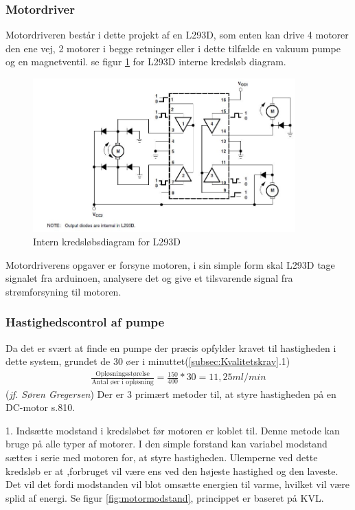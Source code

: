  \subsubsection{Motordriver}
 Motordriveren består i dette projekt af en L293D, som enten kan drive 4 motorer den ene vej, 2 motorer i begge retninger eller i dette tilfælde en vakuum pumpe og en magnetventil. se figur \ref{fig:L293DInterndiagram} for L293D interne kredsløb diagram. 
   \begin{figure}[H]
	\centering
	\includegraphics[width=0.9\textwidth]{billeder/Hardware/diagrammer/L293intern.JPG}
	\caption{Intern kredsløbsdiagram for L293D}
	\label{fig:L293DInterndiagram}
\end{figure}
Motordriverens opgaver er forsyne motoren, i sin simple form skal L293D tage signalet fra arduinoen, analysere det og give et tilsvarende signal fra strømforsyning til motoren.
\subsubsection{Hastighedscontrol af pumpe}
Da det er svært at finde en pumpe der præcis opfylder kravet til hastigheden i dette system, grundet de 30 øer i minuttet(\ref{subsec:Kvalitetskrav}.1)
\begin{align}
\frac{\text{Opløsningsstørelse}}{\text{Antal øer i opløsning}} = \frac{150}{400}*30 = 11,25ml/min
\label{eg:ohastighed}
\end{align}(\textit{jf. Søren Gregersen})
Der er 3 primært metoder til, at styre hastigheden på en DC-motor \citep{ELengbog}s.810.

1. Indsætte modstand i kredsløbet før motoren er koblet til.
Denne metode kan bruge på alle typer af motorer. I den simple forstand kan variabel modstand sættes i serie med motoren for, at styre hastigheden. Ulemperne ved dette kredsløb er at ,forbruget vil være ens ved den højeste hastighed og den laveste. Det vil det fordi modstanden vil blot omsætte energien til varme, hvilket vil være splid af energi. Se figur \ref{fig:motormodstand}, princippet er baseret på KVL.


